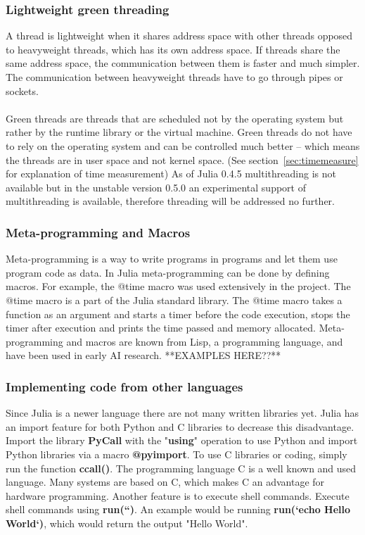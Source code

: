 \documentclass[a4paper, 11pt, titlepage]{article}
\begin{document}
\subsubsection{Lightweight green threading}
A thread is lightweight when it shares address space with other threads opposed to heavyweight threads, which has its own address space. If threads share the same address space, the communication between them is faster and much simpler. The communication between heavyweight threads have to go through pipes or sockets. \\
\\
Green threads are threads that are scheduled not by the operating system but rather by the runtime library or the virtual machine. Green threads do not have to rely on the operating system and can be controlled much better – which means the threads are in user space and not kernel space. (See section~\ref{sec:timemeasure} for explanation of time measurement) As of Julia 0.4.5 multithreading is not available but in the unstable version 0.5.0 an experimental support of multithreading is available, therefore threading will be addressed no further. 

\subsubsection{Meta-programming and Macros}
Meta-programming is a way to write programs in programs and let them use program code as data. In Julia meta-programming can be done by defining macros. For example, the @time macro was used extensively in the project. The @time macro is a part of the Julia standard library. The @time macro takes a function as an argument and starts a timer before the code execution, stops the timer after execution and prints the time passed and memory allocated. Meta-programming and macros are known from Lisp, a programming language, and have been used in early AI research.
**EXAMPLES HERE??**

\subsubsection{Implementing code from other languages}
Since Julia is a newer language there are not many written libraries yet. Julia has an import feature for both Python and C libraries to decrease this disadvantage. Import the library \textbf{PyCall} with the "\textbf{using}" operation to use Python and import Python libraries via a macro \textbf{@pyimport}. To use C libraries or coding, simply run the function \textbf{ccall()}. The programming language C is a well known and used language. Many systems are based on C, which makes C an advantage for hardware programming. Another feature is to execute shell commands. Execute shell commands using \textbf{run(``)}. An example would be running \textbf{run(`echo Hello World`)}, which would return the output "Hello World".
\end{document}
